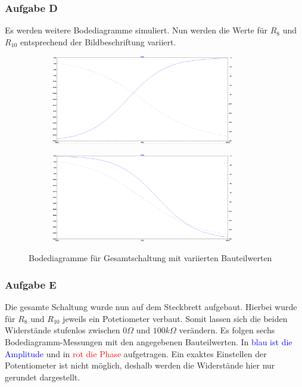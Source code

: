 \subsubsection{Aufgabe D}
Es werden weitere Bodediagramme simuliert. Nun werden die Werte für $R_{8}$ und $R_{10}$ entsprechend der Bildbeschriftung variiert.
\begin{figure}[h]
\centering
\begin{subfigure}{.5\textwidth}
  \centering
  \includegraphics[width=8cm]{pics/10_90}
  \label{Bode1090}
\end{subfigure}%
\begin{subfigure}{.5\textwidth}
  \centering
  \includegraphics[width=8cm]{pics/90_10}
  \label{Bode9010}
\end{subfigure}
\caption{Bodediagramme für Gesamtschaltung mit variierten Bauteilwerten}
\end{figure}

\newpage
\subsubsection{Aufgabe E}
Die gesamte Schaltung wurde nun auf dem Steckbrett aufgebaut. Hierbei wurde für $R_{8}$ und $R_{10}$ jeweils ein Potetiometer verbaut. Somit lassen sich die beiden Widerstände stufenlos zwischen $\si{0}{\Omega}$ und $\si{100}{k\Omega}$ verändern. Es folgen sechs Bodediagramm-Messungen mit den angegebenen Bauteilwerten. In \textcolor{blue}{blau ist die Amplitude} und in \textcolor{red}{rot die Phase} aufgetragen. Ein exaktes Einstellen der Potentiometer ist nicht möglich, deshalb werden die Widerstände hier nur gerundet dargestellt.


